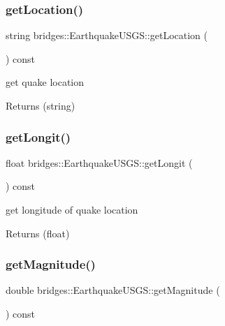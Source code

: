 \subsubsection{\texorpdfstring{get\+Location()}{getLocation()}}
{\footnotesize\ttfamily string bridges\+::\+Earthquake\+U\+S\+G\+S\+::get\+Location (\begin{DoxyParamCaption}{ }\end{DoxyParamCaption}) const\hspace{0.3cm}{\ttfamily [inline]}}

get quake location

\begin{DoxyReturn}{Returns}
(string) 
\end{DoxyReturn}
\mbox{\label{classbridges_1_1_earthquake_u_s_g_s_a0e600967c4e3865e369bb2ed46ba8db4}} 
\subsubsection{\texorpdfstring{get\+Longit()}{getLongit()}}
{\footnotesize\ttfamily float bridges\+::\+Earthquake\+U\+S\+G\+S\+::get\+Longit (\begin{DoxyParamCaption}{ }\end{DoxyParamCaption}) const\hspace{0.3cm}{\ttfamily [inline]}}

get longitude of quake location

\begin{DoxyReturn}{Returns}
(float) 
\end{DoxyReturn}
\mbox{\label{classbridges_1_1_earthquake_u_s_g_s_ac23a3187cae8cda0e2cc1321f8eef7b2}} 
\subsubsection{\texorpdfstring{get\+Magnitude()}{getMagnitude()}}
{\footnotesize\ttfamily double bridges\+::\+Earthquake\+U\+S\+G\+S\+::get\+Magnitude (\begin{DoxyParamCaption}{ }\end{DoxyParamCaption}) const\hspace{0.3cm}{\ttfamily [inline]}}

